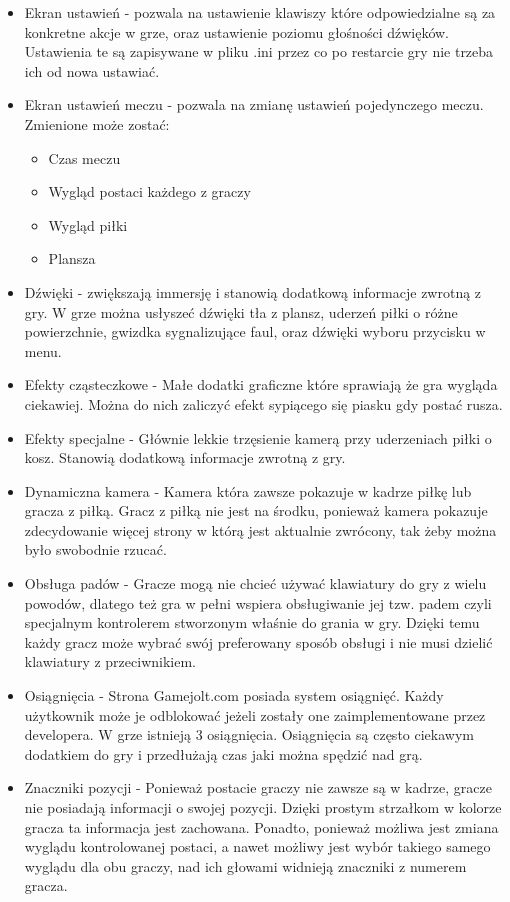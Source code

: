 \documentclass[a4paper,12pt,twoside,openany]{report}
\begin{document}
\begin{itemize}
    \item Ekran ustawień - pozwala na ustawienie klawiszy które odpowiedzialne są za konkretne akcje w grze, oraz ustawienie poziomu głośności dźwięków. Ustawienia te są zapisywane w pliku .ini przez co po restarcie gry nie trzeba ich od nowa ustawiać. 
    \item Ekran ustawień meczu - pozwala na zmianę ustawień pojedynczego meczu. Zmienione może zostać:
    \begin{itemize}
        \item Czas meczu
        \item Wygląd postaci każdego z graczy
        \item Wygląd piłki
        \item Plansza
    \end{itemize}
    \item Dźwięki - zwiększają immersję i stanowią dodatkową informacje zwrotną z gry. W grze można usłyszeć dźwięki tła z plansz, uderzeń piłki o różne powierzchnie, gwizdka sygnalizujące faul, oraz dźwięki wyboru przycisku w menu.
    \item Efekty cząsteczkowe - Małe dodatki graficzne które sprawiają że gra wygląda ciekawiej. Można do nich zaliczyć efekt sypiącego się piasku gdy postać rusza. 
    \item Efekty specjalne - Głównie lekkie trzęsienie kamerą przy uderzeniach piłki o kosz. Stanowią dodatkową informacje zwrotną z gry.
    \item Dynamiczna kamera - Kamera która zawsze pokazuje w kadrze piłkę lub gracza z piłką. Gracz z piłką nie jest na środku, ponieważ kamera pokazuje zdecydowanie więcej strony w którą jest aktualnie zwrócony, tak żeby można było swobodnie rzucać.
    \item Obsługa padów - Gracze mogą nie chcieć używać klawiatury do gry z wielu powodów, dlatego też gra w pełni wspiera obsługiwanie jej tzw. padem czyli specjalnym kontrolerem stworzonym właśnie do grania w gry. Dzięki temu każdy gracz może wybrać swój preferowany sposób obsługi i nie musi dzielić klawiatury z przeciwnikiem.
    \item Osiągnięcia - Strona Gamejolt.com posiada system osiągnięć. Każdy użytkownik może je odblokować jeżeli zostały one zaimplementowane przez developera. W grze istnieją 3 osiągnięcia. Osiągnięcia są często ciekawym dodatkiem do gry i przedłużają czas jaki można spędzić                 nad grą.
    \item Znaczniki pozycji - Ponieważ postacie graczy nie zawsze są w kadrze, gracze nie posiadają informacji o swojej pozycji. Dzięki prostym strzałkom w kolorze gracza ta informacja jest zachowana. Ponadto, ponieważ możliwa jest zmiana wyglądu kontrolowanej postaci, a nawet możliwy jest wybór takiego samego wyglądu dla obu graczy, nad ich głowami widnieją znaczniki z numerem gracza.
\end{itemize}
\end{document}
